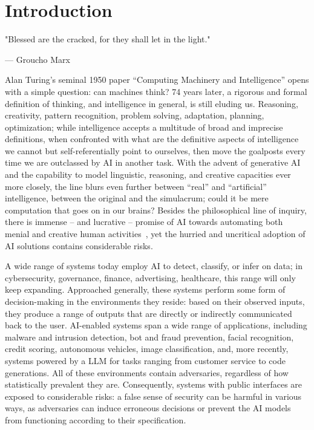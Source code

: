 \chapter{Introduction}\label{ch:introduction}

\epigraph{"Blessed are the cracked, for they shall let in the light."}{--- Groucho Marx}


Alan Turing's seminal 1950 paper ``Computing Machinery and Intelligence'' opens with a simple question: can machines think?
74 years later, a rigorous and formal definition of thinking, and intelligence in general, is still eluding us.
Reasoning, creativity, pattern recognition, problem solving, adaptation, planning, optimization; while intelligence accepts a multitude of broad and imprecise definitions, when confronted with what are the definitive aspects of intelligence we cannot but self-referentially point to ourselves, then move the goalposts every time we are outclassed by \gls{AI} in another task.
With the advent of generative \gls{AI} and the capability to model linguistic, reasoning, and creative capacities ever more closely, the line blurs even further between ``real'' and ``artificial'' intelligence, between the original and the simulacrum; could it be mere computation that goes on in our brains?
Besides the philosophical line of inquiry, there is immense -- and lucrative -- promise of \gls{AI} towards automating both menial and creative human activities~\cite{benjamin1935work}, yet the hurried and uncritical adoption of \gls{AI} solutions contains considerable risks.

A wide range of systems today employ \gls{AI} to detect, classify, or infer on data; in cybersecurity, governance, finance, advertising, healthcare, this range will only keep expanding.
Approached generally, these systems perform some form of decision-making in the environments they reside: based on their observed inputs, they produce a range of outputs that are directly or indirectly communicated back to the user.
AI-enabled systems span a wide range of applications, including malware and intrusion detection, bot and fraud prevention, facial recognition, credit scoring, autonomous vehicles, image classification, and, more recently, systems powered by a \gls{LLM} for tasks ranging from customer service to code generations.
All of these environments contain adversaries, regardless of how statistically prevalent they are.
Consequently, systems with public interfaces are exposed to considerable risks: a false sense of security can be harmful in various ways, as adversaries can induce erroneous decisions or prevent the \gls{AI} models from functioning according to their specification.

